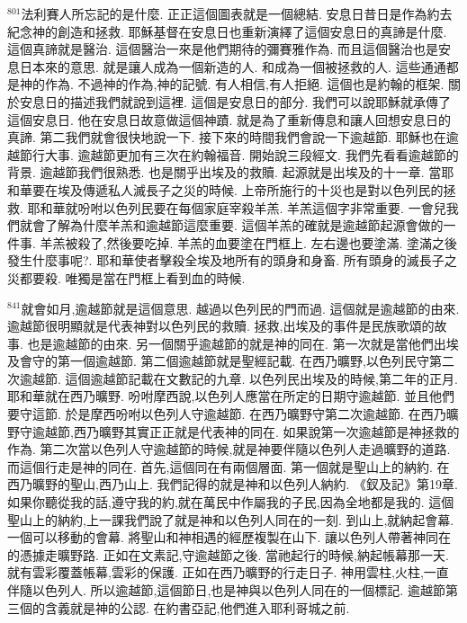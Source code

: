 \documentclass{book}
\begin{document}
$^{801}$法利賽人所忘記的是什麼.
正正這個圖表就是一個總結.
安息日昔日是作為約去紀念神的創造和拯救.
耶穌基督在安息日也重新演繹了這個安息日的真諦是什麼.
這個真諦就是醫治.
這個醫治一來是他們期待的彌賽雅作為.
而且這個醫治也是安息日本來的意思.
就是讓人成為一個新造的人.
和成為一個被拯救的人.
這些通通都是神的作為.
不過神的作為,神的記號.
有人相信,有人拒絕.
這個也是約翰的框架.
關於安息日的描述我們就說到這裡.
這個是安息日的部分.
我們可以說耶穌就承傳了這個安息日.
他在安息日故意做這個神蹟.
就是為了重新傳息和讓人回想安息日的真諦.
第二我們就會很快地說一下.
接下來的時間我們會說一下逾越節.
耶穌也在逾越節行大事.
逾越節更加有三次在約翰福音.
開始說三段經文.
我們先看看逾越節的背景.
逾越節我們很熟悉.
也是關乎出埃及的救贖.
起源就是出埃及的十一章.
當耶和華要在埃及傳遞私人滅長子之災的時候.
上帝所施行的十災也是對以色列民的拯救.
耶和華就吩咐以色列民要在每個家庭宰殺羊羔.
羊羔這個字非常重要.
一會兒我們就會了解為什麼羊羔和逾越節這麼重要.
這個羊羔的確就是逾越節起源會做的一件事.
羊羔被殺了,然後要吃掉.
羊羔的血要塗在門框上.
左右邊也要塗滿.
塗滿之後發生什麼事呢?.
耶和華使者擊殺全埃及地所有的頭身和身畜.
所有頭身的滅長子之災都要殺.
唯獨是當在門框上看到血的時候.

$^{841}$就會如月,逾越節就是這個意思.
越過以色列民的門而過.
這個就是逾越節的由來.
逾越節很明顯就是代表神對以色列民的救贖.
拯救,出埃及的事件是民族歌頌的故事.
也是逾越節的由來.
另一個關乎逾越節的就是神的同在.
第一次就是當他們出埃及會守的第一個逾越節.
第二個逾越節就是聖經記載.
在西乃曠野,以色列民守第二次逾越節.
這個逾越節記載在文數記的九章.
以色列民出埃及的時候,第二年的正月.
耶和華就在西乃曠野.
吩咐摩西說,以色列人應當在所定的日期守逾越節.
並且他們要守這節.
於是摩西吩咐以色列人守逾越節.
在西乃曠野守第二次逾越節.
在西乃曠野守逾越節,西乃曠野其實正正就是代表神的同在.
如果說第一次逾越節是神拯救的作為.
第二次當以色列人守逾越節的時候,就是神要伴隨以色列人走過曠野的道路.
而這個行走是神的同在.
首先,這個同在有兩個層面.
第一個就是聖山上的納約.
在西乃曠野的聖山,西乃山上.
我們記得的就是神和以色列人納約.
《釵及記》第19章.
如果你聽從我的話,遵守我的約,就在萬民中作屬我的子民,因為全地都是我的.
這個聖山上的納約,上一課我們說了就是神和以色列人同在的一刻.
到山上,就納起會幕.
一個可以移動的會幕.
將聖山和神相遇的經歷複製在山下.
讓以色列人帶著神同在的憑據走曠野路.
正如在文素記,守逾越節之後.
當祂起行的時候,納起帳幕那一天.
就有雲彩覆蓋帳幕,雲彩的保護.
正如在西乃曠野的行走日子.
神用雲柱,火柱,一直伴隨以色列人.
所以逾越節,這個節日,也是神與以色列人同在的一個標記.
逾越節第三個的含義就是神的公認.
在約書亞記,他們進入耶利哥城之前.
\end{document}
